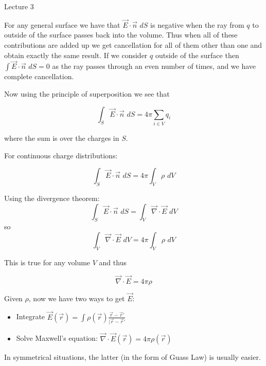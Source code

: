 \begin{center}

Lecture 3

\end{center}

For any general surface we have that $\vec{E} \cdot \vec{n} \, \, dS$ is negative when the ray from $q$ to outside of the surface passes back into the volume. Thus when all of these contributions are added up we get cancellation for all of them other than one and obtain exactly the same result. If we consider $q$ outside of the surface then $\int \vec{E} \cdot \vec{n} \, \, dS = 0$ as the ray passes through an even number of times, and we have complete cancellation.

Now using the principle of superposition we see that 

\begin{equation}
\int_S \vec{E} \cdot \vec{n} \, \, dS = 4 \pi \sum_{i \in V} q_i
\end{equation}

where the sum is over the charges in $S$.

For continuous charge distributions:

\begin{equation}
\int_S \vec{E} \cdot \vec{n} \, \, dS = 4 \pi \int_V \rho \, \, dV
\end{equation}

Using the divergence theorem: $$ \int_S \vec{E} \cdot \vec{n} \, \, dS = \int_V \vec{\nabla} \cdot \vec{E} \, \, dV$$ so
$$\int_V \vec{\nabla} \cdot \vec{E} \, \, dV = 4 \pi \int_V \rho \, \, dV$$

This is true for any volume $V$ and thus 

\begin{equation}
\vec{\nabla} \cdot \vec{E} = 4 \pi \rho
\end{equation}

Given $\rho$, now we have two ways to get $\vec{E}$:

\begin{itemize}
\item Integrate $\vec{E}(\vec{r}) = \int \rho(\vec{r}) \frac{\vec{r} - \vec{r}'}{|\vec{r} - \vec{r}'}$
\item Solve Maxwell's equation: $\vec{\nabla} \cdot \vec{E}(\vec{r}) = 4 \pi \rho (\vec{r})$
\end{itemize}

In symmetrical situations, the latter (in the form of Guass Law) is usually easier.

